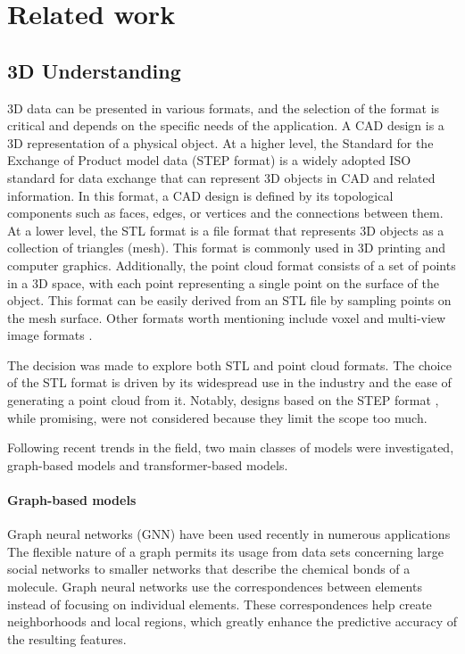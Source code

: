 \chapter{Related work}
\label{chap:related_work}

\section{3D Understanding}

3D data can be presented in various formats, and the selection of the format is critical and depends on the specific needs of the application. A CAD design is a 3D representation of a physical object. At a higher level, the Standard for the Exchange of Product model data (STEP format) is a widely adopted ISO standard for data exchange that can represent 3D objects in CAD and related information. In this format, a CAD design is defined by its topological components such as faces, edges, or vertices and the connections between them. At a lower level, the STL format is a file format that represents 3D objects as a collection of triangles (mesh). This format is commonly used in 3D printing and computer graphics. Additionally, the point cloud format consists of a set of points in a 3D space, with each point representing a single point on the surface of the object. This format can be easily derived from an STL file by sampling points on the mesh surface. Other formats worth mentioning include voxel and multi-view image formats \cite{zhangDeepLearningbased3D2023}.

The decision was made to explore both STL and point cloud formats. The choice of the STL format is driven by its widespread use in the industry and the ease of generating a point cloud from it. Notably, designs based on the STEP format \cite{mandelliCAD3DModel2022}, while promising, were not considered because they limit the scope too much.

Following recent trends in the field, two main classes of models were investigated, graph-based models and transformer-based models.

\subsubsection{Graph-based models}

Graph neural networks (GNN) have been used recently in numerous applications \cite{wuComprehensiveSurveyGraph2021,jumperHighlyAccurateProtein2021}
The flexible nature of a graph permits its usage from data sets concerning large social networks to smaller networks that describe the chemical bonds of a molecule. Graph neural networks use the correspondences between elements instead of focusing on individual elements. These correspondences help create neighborhoods and local regions, which greatly enhance the predictive accuracy of the resulting features.

